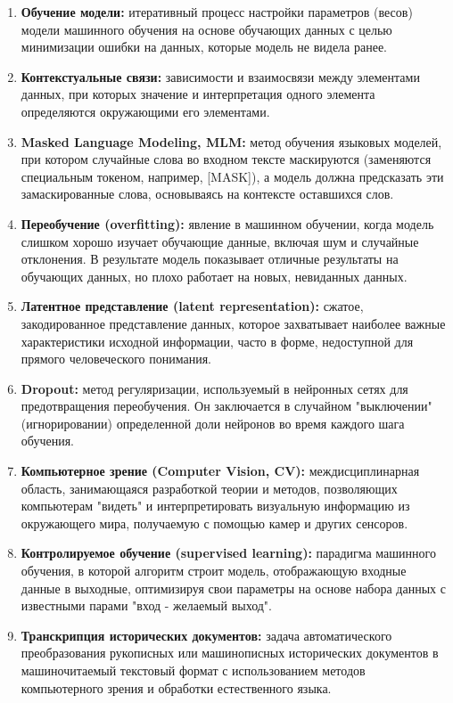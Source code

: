 \begin{enumerate}
    \item  \textbf{Обучение модели:} итеративный процесс настройки параметров (весов) модели машинного обучения на основе обучающих данных с целью минимизации ошибки на данных, которые модель не видела ранее.
    \item  \textbf{Контекстуальные связи:} зависимости и взаимосвязи между элементами данных, при которых значение и интерпретация одного элемента определяются окружающими его элементами.  
    \item  \textbf{Masked Language Modeling, MLM:} метод обучения языковых моделей, при котором случайные слова во входном тексте маскируются (заменяются специальным токеном, например, [MASK]), а модель должна предсказать эти замаскированные слова, основываясь на контексте оставшихся слов.
    \item  \textbf{Переобучение (overfitting):} явление в машинном обучении, когда модель слишком хорошо изучает обучающие данные, включая шум и случайные отклонения. В результате модель показывает отличные результаты на обучающих данных, но плохо работает на новых, невиданных данных.
    \item  \textbf{Латентное представление (latent representation):} сжатое, закодированное представление данных, которое захватывает наиболее важные характеристики исходной информации, часто в форме, недоступной для прямого человеческого понимания. 
    \item  \textbf{Dropout:} метод регуляризации, используемый в нейронных сетях для предотвращения переобучения. Он заключается в случайном "выключении" (игнорировании) определенной доли нейронов во время каждого шага обучения.
    \item  \textbf{Компьютерное зрение (Computer Vision, CV):} междисциплинарная область, занимающаяся разработкой теории и методов,  позволяющих компьютерам "видеть"   и интерпретировать визуальную информацию из окружающего мира, получаемую с помощью камер и других сенсоров.
    \item  \textbf{Контролируемое обучение (supervised learning):} парадигма машинного обучения, в которой алгоритм строит модель, отображающую входные данные в выходные,  оптимизируя  свои  параметры  на  основе  набора  данных  с  известными  парами  "вход - желаемый  выход". 
    \item  \textbf{Транскрипция исторических документов:} задача автоматического преобразования рукописных или машинописных исторических документов в машиночитаемый текстовый формат с использованием методов компьютерного зрения и обработки естественного языка. 
\end{enumerate} 
    

\newpage
